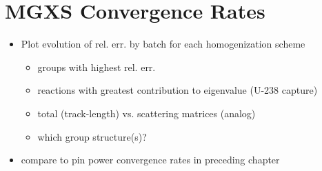 \section{MGXS Convergence Rates}
\label{sec:chap8-mgxs-converge}

\begin{itemize}[noitemsep]
  \item Plot evolution of rel. err. by batch for each homogenization scheme
  \begin{itemize}[noitemsep]
    \item groups with highest rel. err.
    \item reactions with greatest contribution to eigenvalue (U-238 capture)
    \item total (track-length) vs. scattering matrices (analog)    
    \item which group structure(s)?
 \end{itemize}
  \item compare to pin power convergence rates in preceding chapter
\end{itemize}

